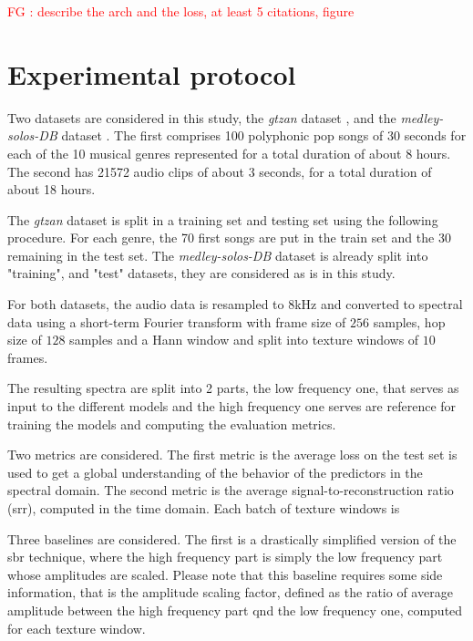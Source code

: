 \documentclass{article}
\newcommand{\fg}[1]{\textcolor{red}{FG : #1}}
\begin{document}
\fg{describe the arch and the loss, at least 5 citations, figure}

\section{Experimental protocol}
\label{sec:protocol}

Two datasets are considered in this study, the \textit{gtzan} dataset \cite{tzanetakis2002musical}, and the \textit{medley-solos-DB} dataset \cite{lostanlen2016deep}. The first comprises 100 polyphonic pop songs of 30 seconds for each of the 10 musical genres represented for a total duration of about 8 hours. The second has 21572 audio clips of about 3 seconds, for a total duration of about 18 hours.

The \textit{gtzan} dataset is split in a training set and testing set using the following procedure. For each genre, the 70 first songs are put in the train set and the 30 remaining in the test set. The \textit{medley-solos-DB} dataset is already split into "training", and "test" datasets, they are considered as is in this study.

For both datasets, the audio data is resampled to $8$kHz and converted to spectral data using a short-term Fourier transform with frame size of $256$ samples, hop size of $128$ samples and a Hann window and split into texture windows of $10$ frames.

The resulting spectra are split into 2 parts, the low frequency one, that serves as input to the different models and the high frequency one serves are reference for training the models and computing the evaluation metrics.

Two metrics are considered. The first metric is the average loss on the test set is used to get a global understanding of the behavior of the predictors in the spectral domain. The second metric is the average signal-to-reconstruction ratio (srr), computed in the time domain. Each batch of texture windows is

Three baselines are considered. The first is a drastically simplified version of the sbr technique, where the high frequency part is simply the low frequency part whose amplitudes are scaled. Please note that this baseline requires some side information, that is the amplitude scaling factor, defined as the ratio of average amplitude between the high frequency part qnd the low frequency one, computed for each texture window.
\end{document}
